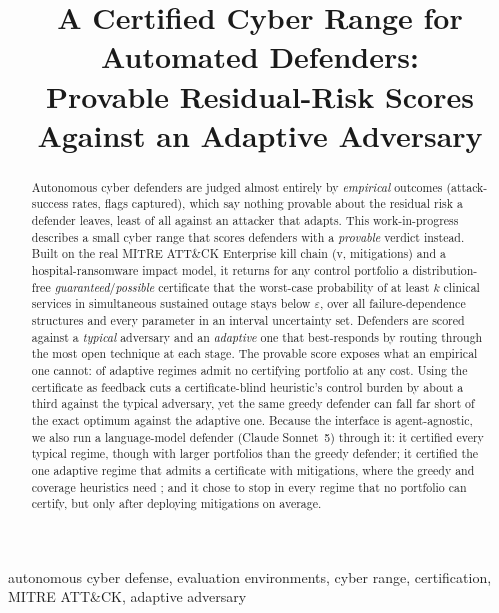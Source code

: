 \documentclass[conference,compsoc]{IEEEtran}
\begin{document}
\title{A Certified Cyber Range for Automated Defenders:\\
Provable Residual-Risk Scores Against an Adaptive Adversary}
\author{}
\maketitle

\begin{abstract}
Autonomous cyber defenders are judged almost entirely by \emph{empirical} outcomes
(attack-success rates, flags captured), which say nothing provable about the residual
risk a defender leaves, least of all against an attacker that adapts. This
work-in-progress describes a small cyber range that scores defenders with a
\emph{provable} verdict instead. Built on the real MITRE ATT\&CK Enterprise kill chain
(v\RangeAttackVersion, \RangeMitigations{} mitigations) and a hospital-ransomware impact
model, it returns for any control portfolio a distribution-free
\emph{guaranteed}/\emph{possible} certificate that the worst-case probability of at least
$k$ clinical services in simultaneous sustained outage stays below $\varepsilon$, over
all failure-dependence structures and every parameter in an interval uncertainty set.
Defenders are scored against a \emph{typical} adversary and an \emph{adaptive} one that
best-responds by routing through the most open technique at each stage. The provable
score exposes what an empirical one cannot: \RangeAdaptiveUncert{} of
\RangeAdaptiveRegimes{} adaptive regimes admit no certifying portfolio at any cost. Using
the certificate as feedback cuts a certificate-blind heuristic's control burden by about
a third against the typical adversary, yet the same greedy defender can fall far short
of the exact optimum against the adaptive one. Because the interface is agent-agnostic, we
also run a language-model defender (Claude Sonnet~5) through it: it certified every
typical regime, though with larger portfolios than the greedy defender; it certified the
one adaptive regime that admits a certificate with \ClAdaptRange{} mitigations, where the
greedy and coverage heuristics need \ClAdaptGreedy; and it chose to stop in every regime
that no portfolio can certify, but only after deploying \ClUncertDeployed{} mitigations on
average.
\end{abstract}

\begin{IEEEkeywords}
autonomous cyber defense, evaluation environments, cyber range, certification,
MITRE ATT\&CK, adaptive adversary
\end{IEEEkeywords}
\end{document}
